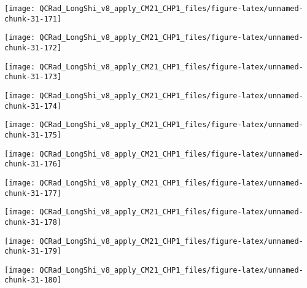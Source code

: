 \documentclass[
  10pt,
  a4paper,oneside]{article}
\begin{document}
\begin{center}\texttt{[image: QCRad\_LongShi\_v8\_apply\_CM21\_CHP1\_files/figure-latex/unnamed-chunk-31-171]} \end{center}

\begin{center}\texttt{[image: QCRad\_LongShi\_v8\_apply\_CM21\_CHP1\_files/figure-latex/unnamed-chunk-31-172]} \end{center}

\begin{center}\texttt{[image: QCRad\_LongShi\_v8\_apply\_CM21\_CHP1\_files/figure-latex/unnamed-chunk-31-173]} \end{center}

\begin{center}\texttt{[image: QCRad\_LongShi\_v8\_apply\_CM21\_CHP1\_files/figure-latex/unnamed-chunk-31-174]} \end{center}

\begin{center}\texttt{[image: QCRad\_LongShi\_v8\_apply\_CM21\_CHP1\_files/figure-latex/unnamed-chunk-31-175]} \end{center}

\begin{center}\texttt{[image: QCRad\_LongShi\_v8\_apply\_CM21\_CHP1\_files/figure-latex/unnamed-chunk-31-176]} \end{center}

\begin{center}\texttt{[image: QCRad\_LongShi\_v8\_apply\_CM21\_CHP1\_files/figure-latex/unnamed-chunk-31-177]} \end{center}

\begin{center}\texttt{[image: QCRad\_LongShi\_v8\_apply\_CM21\_CHP1\_files/figure-latex/unnamed-chunk-31-178]} \end{center}

\begin{center}\texttt{[image: QCRad\_LongShi\_v8\_apply\_CM21\_CHP1\_files/figure-latex/unnamed-chunk-31-179]} \end{center}

\begin{center}\texttt{[image: QCRad\_LongShi\_v8\_apply\_CM21\_CHP1\_files/figure-latex/unnamed-chunk-31-180]} \end{center}
\end{document}

